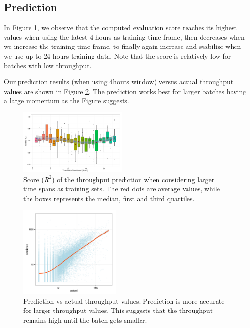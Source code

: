 \subsection{Prediction}
In Figure \ref{fig:accuracy}, we observe that the computed evaluation score reaches its highest values when using the latest 4 hours as training time-frame, then decreases when we increase the training time-frame, to finally again increase and stabilize when we use up to 24 hours training data.
Note that the score is relatively low for batches with low throughput. 

Our prediction results (when using 4hours window) versus actual throughput values are shown in Figure \ref{fig:pred}. The prediction works best for larger batches having a large momentum as the Figure suggests.

\begin{figure}[t!]
	\centering
		\includegraphics[width=0.48\textwidth]{figures/ML_accuracy}
	\caption{Score ($R^2$) of the throughput prediction when considering larger time spans as training sets. The red dots are average values, while the boxes represents the median, first and third quartiles.}
	\label{fig:accuracy}
\end{figure}


\begin{figure}[t!]
	\centering
		\includegraphics[width=0.45\textwidth]{figures/predictions_3}
	\caption{Prediction vs actual throughput values. Prediction is more accurate for larger throughput values. This suggests that the throughput remains high until the batch gets smaller.}
	\label{fig:pred}
\end{figure}

